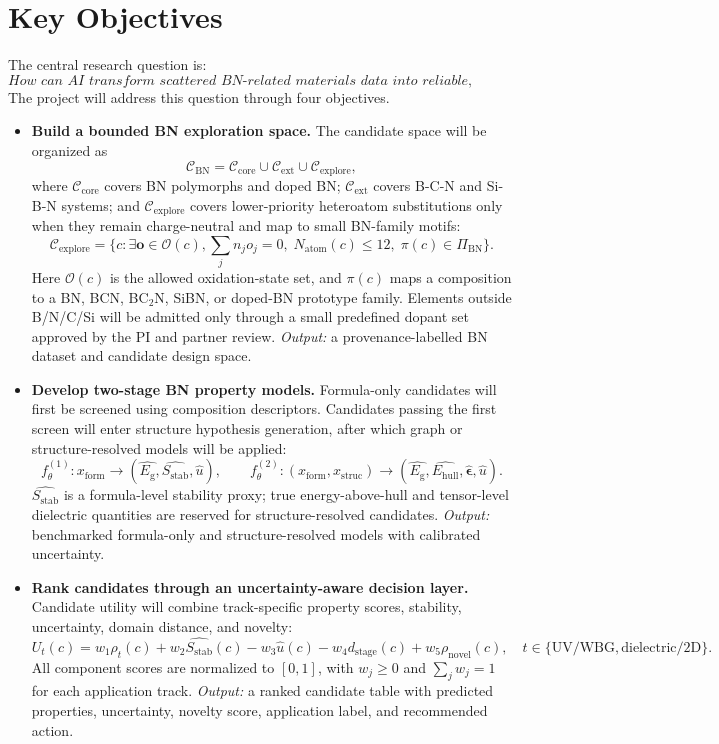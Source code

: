 \documentclass[10pt,a4paper]{article}
\newcommand{\eg}{E_{\mathrm{g}}}
\newcommand{\ehull}{E_{\mathrm{hull}}}
\newcommand{\form}{x_{\mathrm{form}}}
\newcommand{\struc}{x_{\mathrm{struc}}}
\newcommand{\unc}{u}
\newcommand{\stab}{S_{\mathrm{stab}}}
\newcommand{\utility}{U}
\newcommand{\novel}{\rho_{\mathrm{novel}}}
\begin{document}
\section{Key Objectives}
The central research question is:
\[
  \textit{How can AI transform scattered BN-related materials data into reliable, uncertainty-aware research decisions?}
\]
The project will address this question through four objectives.
\begin{itemize}[leftmargin=*]
  \item \textbf{Build a bounded BN exploration space.} The candidate space will be organized as
  \[
    \mathcal{C}_{\mathrm{BN}}=
    \mathcal{C}_{\mathrm{core}}\cup\mathcal{C}_{\mathrm{ext}}\cup\mathcal{C}_{\mathrm{explore}},
  \]
  where $\mathcal{C}_{\mathrm{core}}$ covers BN polymorphs and doped BN;
  $\mathcal{C}_{\mathrm{ext}}$ covers B-C-N and Si-B-N systems; and
  $\mathcal{C}_{\mathrm{explore}}$ covers lower-priority heteroatom substitutions only when they remain charge-neutral and map to small BN-family motifs:
  \[
    \mathcal{C}_{\mathrm{explore}}=
    \{c:\exists \mathbf{o}\in\mathcal{O}(c),\sum_j n_j o_j=0,\;
    N_{\mathrm{atom}}(c)\le 12,\;\pi(c)\in\Pi_{\mathrm{BN}}\}.
  \]
  Here $\mathcal{O}(c)$ is the allowed oxidation-state set, and $\pi(c)$ maps a composition to a BN, BCN, BC$_2$N, SiBN, or doped-BN prototype family. Elements outside B/N/C/Si will be admitted only through a small predefined dopant set approved by the PI and partner review.
  \textit{Output:} a provenance-labelled BN dataset and candidate design space.

  \item \textbf{Develop two-stage BN property models.} Formula-only candidates will first be screened using composition descriptors. Candidates passing the first screen will enter structure hypothesis generation, after which graph or structure-resolved models will be applied:
  \[
    f_{\theta}^{(1)}:\form\rightarrow(\hat{\eg},\hat{\stab},\hat{\unc}),
    \qquad
    f_{\theta}^{(2)}:(\form,\struc)\rightarrow
    (\hat{\eg},\hat{\ehull},\hat{\boldsymbol{\epsilon}},\hat{\unc}).
  \]
  $\hat{\stab}$ is a formula-level stability proxy; true energy-above-hull and tensor-level dielectric quantities are reserved for structure-resolved candidates.
  \textit{Output:} benchmarked formula-only and structure-resolved models with calibrated uncertainty.

  \item \textbf{Rank candidates through an uncertainty-aware decision layer.} Candidate utility will combine track-specific property scores, stability, uncertainty, domain distance, and novelty:
  \[
    \utility_t(c)=w_1\rho_t(c)+w_2\hat{\stab}(c)-w_3\hat{\unc}(c)
    -w_4 d_{\mathrm{stage}}(c)+w_5\novel(c),\quad
    t\in\{\mathrm{UV/WBG},\mathrm{dielectric/2D}\}.
  \]
  All component scores are normalized to $[0,1]$, with $w_j\ge0$ and $\sum_j w_j=1$ for each application track.
  \textit{Output:} a ranked candidate table with predicted properties, uncertainty, novelty score, application label, and recommended action.


\end{itemize}
\end{document}

